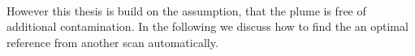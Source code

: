 \\
However this thesis is build on the assumption, that the plume is free of additional contamination. In the following we discuss how to find the an optimal reference from another scan automatically.
\begin{figure}
	\caption{}
	\label{fig:contaminationdependencyso2}
\end{figure}